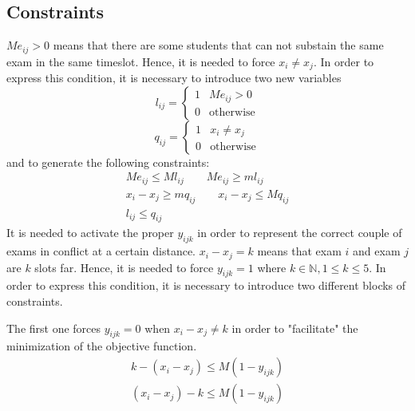 \subsection*{Constraints}
$ Me_{ij} > 0 $ means that there are some students that can not substain the same exam in the same timeslot. Hence, it is needed to force $ x_{i} \ne x_{j} $.
In order to express this condition, it is necessary to introduce two new variables
\[
l_{ij} = 
\begin{cases}
1	&	Me_{ij} > 0	\\
0	&	\text{otherwise}
\end{cases}
\]
\[
q_{ij} = 
\begin{cases}
1	&	x_{i} \ne x_{j}	\\
0	&	\text{otherwise}
\end{cases}
\]
and to generate the following constraints:
\begin{gather*}
Me_{ij} \le M l_{ij} \qquad Me_{ij} \ge m l_{ij} \\
x_{i} - x_{j} \ge m q_{ij} \qquad x_{i} - x_{j} \le M q_{ij} \\
l_{ij} \le q_{ij}
\end{gather*}
\newline
It is needed to activate the proper $ y_{ijk} $ in order to represent the correct couple of exams in conflict at a certain distance.
\newline
$ x_{i} - x_{j} = k $ means that exam $i$ and exam $j$ are $k$ slots far. Hence, it is needed to force $ y_{ijk} = 1 $ where $ k \in \mathbb{N}, 1 \le k \le 5 $.
In order to express this condition, it is necessary to introduce two different blocks of constraints.

The first one forces $ y_{ijk} = 0 $ when $ x_{i} - x_{j} \ne k $ in order to "facilitate" the minimization of the objective function.
\begin{gather*}
k - (x_{i} - x_{j}) \le M (1-y_{ijk}) \\
(x_{i} - x_{j}) - k \le M (1-y_{ijk})
\end{gather*}

